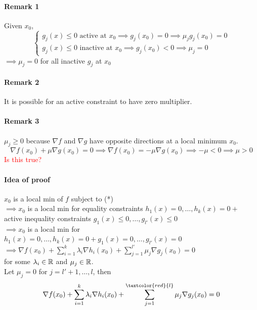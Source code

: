 \documentclass[11pt]{article}
\begin{document}
\paragraph{Remark 1}
Given $x_0$, 
$$
\begin{cases}
g_j(x) \leq 0 \text{ active at } x_0 \implies g_j(x_0) = 0 \implies \mu_jg_j(x_0) = 0 \\
g_j(x) \leq 0 \text{ inactive at } x_0 \implies g_j(x_0) < 0 \implies \mu_j = 0
\end{cases}
$$
$\implies \mu_j = 0$ for all inactive $g_j$ at $x_0$

\paragraph{Remark 2}
It is possible for an active constraint to have zero multiplier.

\paragraph{Remark 3}
$\mu_j \geq 0$ because $\nabla f$ and $\nabla g$ have opposite directions at a local minimum $x_0$. \\
$$\nabla f(x_0) + \mu \nabla g(x_0) = 0 \implies \nabla f(x_0) = -\mu \nabla g(x_0) \implies -\mu < 0 \implies \mu > 0 $$
\textcolor{red}{Is this true?}

\paragraph{Idea of proof}
$x_0$ is a local min of $f$ subject to (*) \\
$\implies x_0$ is a local min for equality constraints $h_1(x) = 0, \hdots, h_k(x) = 0 +$ active inequality constraints $g_1(x) \leq 0, \hdots, g_{l'}(x) \leq 0$ \\
$\implies x_0$ is a local min for $h_1(x) = 0, \hdots, h_k(x) = 0 + g_1(x) = 0, \hdots, g_{l'}(x) = 0$ 
$\implies \nabla f(x_0) + \sum_{i=1}^k \lambda_i \nabla h_i(x_0) + \sum_{j=1}^{l'} \mu_j \nabla g_j(x_0) = 0$\\
for some $\lambda_i \in \mathbb{R}$ and $\mu_j \in \mathbb{R}$.\\
Let $\mu_j = 0$ for $j = l' + 1, \hdots, l$,
then 
$$\nabla f(x_0) + \sum_{i=1}^k \lambda_i \nabla h_i(x_0) + \sum_{j=1}^{\textcolor{red}{l}} \mu_j \nabla g_j(x_0) = 0$$
\end{document}
